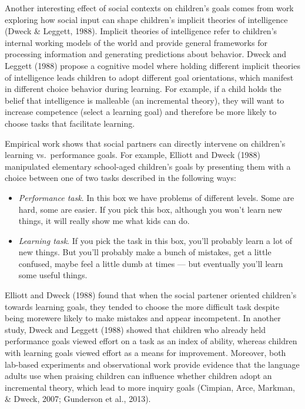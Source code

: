 \documentclass[english,floatsintext,man]{apa6}
\providecommand{\tightlist}{%
  \setlength{\itemsep}{0pt}\setlength{\parskip}{0pt}}
\theoremstyle{definition}
\theoremstyle{definition}
\theoremstyle{definition}
\theoremstyle{remark}
\begin{document}
Another interesting effect of social contexts on children's goals comes
from work exploring how social input can shape children's implicit
theories of intelligence (Dweck \& Leggett, 1988). Implicit theories of
intelligence refer to children's internal working models of the world
and provide general frameworks for processing information and generating
predictions about behavior. Dweck and Leggett (1988) propose a cognitive
model where holding different implicit theories of intelligence leads
children to adopt different goal orientations, which manifest in
different choice behavior during learning. For example, if a child holds
the belief that intelligence is malleable (an incremental theory), they
will want to increase competence (select a learning goal) and therefore
be more likely to choose tasks that facilitate learning.

Empirical work shows that social partners can directly intervene on
children's learning vs.~performance goals. For example, Elliott and
Dweck (1988) manipulated elementary school-aged children's goals by
presenting them with a choice between one of two tasks described in the
following ways:

\begin{itemize}
\tightlist
\item
  \emph{Performance task}. In this box we have problems of different
  levels. Some are hard, some are easier. If you pick this box, although
  you won't learn new things, it will really show me what kids can do.
\item
  \emph{Learning task}. If you pick the task in this box, you'll
  probably learn a lot of new things. But you'll probably make a bunch
  of mistakes, get a little confused, maybe feel a little dumb at times
  --- but eventually you'll learn some useful things.
\end{itemize}

\noindent
Elliott and Dweck (1988) found that when the social partener oriented
children's towards learning goals, they tended to choose the more
difficult task despite being morewere likely to make mistakes and appear
incompetent. In another study, Dweck and Leggett (1988) showed that
children who already held performance goals viewed effort on a task as
an index of ability, whereas children with learning goals viewed effort
as a means for improvement. Moreover, both lab-based experiments and
observational work provide evidence that the language adults use when
praising children can influence whether children adopt an incremental
theory, which lead to more inquiry goals (Cimpian, Arce, Markman, \&
Dweck, 2007; Gunderson et al., 2013).
\end{document}
